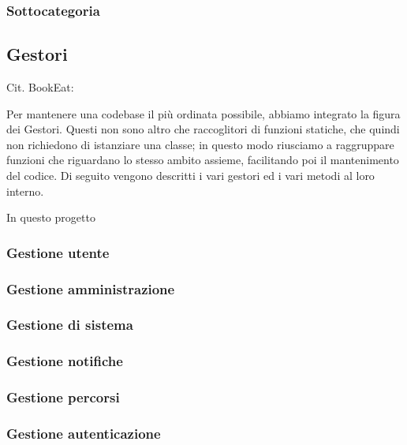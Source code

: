 \documentclass{article}
\begin{document}
\subsubsection{Sottocategoria}

\clearpage

\subsection{Gestori}

Cit. BookEat:

Per mantenere una codebase il più ordinata possibile, abbiamo integrato la figura dei Gestori. 
Questi non sono altro che raccoglitori di funzioni statiche, che quindi non richiedono di istanziare una classe; in questo modo riusciamo a raggruppare funzioni che riguardano lo stesso ambito assieme, facilitando poi il mantenimento del codice. Di seguito vengono descritti i vari gestori ed i vari metodi al loro interno.

In questo progetto 

\subsubsection{Gestione utente}

\subsubsection{Gestione amministrazione}

\subsubsection{Gestione di sistema}

\subsubsection{Gestione notifiche}

\subsubsection{Gestione percorsi}

\subsubsection{Gestione autenticazione}
\end{document}
